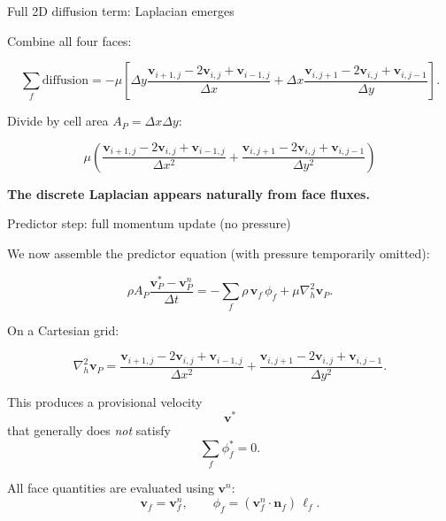 \documentclass[aspectratio=169]{beamer}
\begin{document}
\begin{frame}{Full 2D diffusion term: Laplacian emerges}

Combine all four faces:

\[
\sum_f \text{diffusion}
=
-\mu \left[
\Delta y
\frac{\mathbf{v}_{i+1,j}-2\mathbf{v}_{i,j}+\mathbf{v}_{i-1,j}}{\Delta x}
+
\Delta x
\frac{\mathbf{v}_{i,j+1}-2\mathbf{v}_{i,j}+\mathbf{v}_{i,j-1}}{\Delta y}
\right].
\]

\bigskip
Divide by cell area $A_P=\Delta x\Delta y$:

\[
\boxed{
\mu
\left(
\frac{\mathbf{v}_{i+1,j}-2\mathbf{v}_{i,j}+\mathbf{v}_{i-1,j}}{\Delta x^2}
+
\frac{\mathbf{v}_{i,j+1}-2\mathbf{v}_{i,j}+\mathbf{v}_{i,j-1}}{\Delta y^2}
\right)
}
\]

\bigskip
\centering
\textbf{The discrete Laplacian appears naturally from face fluxes.}

\end{frame}
\begin{frame}{Predictor step: full momentum update (no pressure)}

We now assemble the predictor equation
(with pressure temporarily omitted):

\[
\rho A_P \frac{\mathbf{v}_P^{*}-\mathbf{v}_P^{n}}{\Delta t}
=
-\sum_{f}
\rho\,\mathbf{v}_f\,\phi_f
+
\mu \nabla_h^2 \mathbf{v}_P.
\]

\bigskip
On a Cartesian grid:

\[
\nabla_h^2 \mathbf{v}_P
=
\frac{\mathbf{v}_{i+1,j}-2\mathbf{v}_{i,j}+\mathbf{v}_{i-1,j}}{\Delta x^2}
+
\frac{\mathbf{v}_{i,j+1}-2\mathbf{v}_{i,j}+\mathbf{v}_{i,j-1}}{\Delta y^2}.
\]

\bigskip
This produces a provisional velocity
\[
\mathbf{v}^*
\]
that generally does \emph{not} satisfy
\[
\sum_f \phi_f^* = 0.
\]

\end{frame}

\begin{frame}
All face quantities are evaluated using $\mathbf{v}^n$:
\[
\mathbf{v}_f = \mathbf{v}_f^n,
\qquad
\phi_f = (\mathbf{v}_f^n\cdot\mathbf{n}_f)\,\ell_f.
\]

\end{frame}


\end{document}
